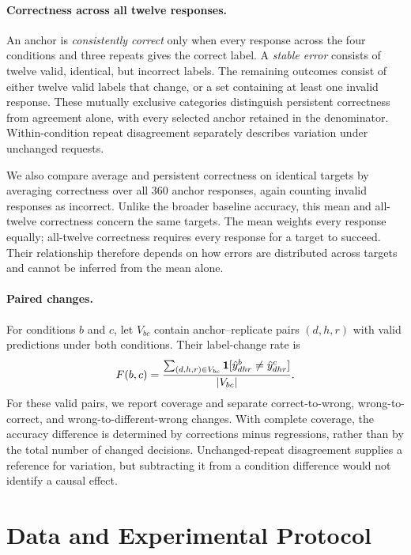 \documentclass{article}
\begin{document}
\paragraph{Correctness across all twelve responses.}
An anchor is \emph{consistently correct} only when every response across the four conditions and three repeats gives the correct label. A \emph{stable error} consists of twelve valid, identical, but incorrect labels. The remaining outcomes consist of either twelve valid labels that change, or a set containing at least one invalid response. These mutually exclusive categories distinguish persistent correctness from agreement alone, with every selected anchor retained in the denominator. Within-condition repeat disagreement separately describes variation under unchanged requests.

We also compare average and persistent correctness on identical targets by averaging correctness over all 360 anchor responses, again counting invalid responses as incorrect. Unlike the broader baseline accuracy, this mean and all-twelve correctness concern the same targets. The mean weights every response equally; all-twelve correctness requires every response for a target to succeed. Their relationship therefore depends on how errors are distributed across targets and cannot be inferred from the mean alone.

\paragraph{Paired changes.}
For conditions $b$ and $c$, let $V_{bc}$ contain anchor--replicate pairs $(d,h,r)$ with valid predictions under both conditions. Their label-change rate is
\begin{equation*}
F(b,c)=\frac{\sum_{(d,h,r)\in V_{bc}}\mathbf{1}[\hat y^b_{dhr}\ne\hat y^c_{dhr}]}{|V_{bc}|}.
\end{equation*}
For these valid pairs, we report coverage and separate correct-to-wrong, wrong-to-correct, and wrong-to-different-wrong changes. With complete coverage, the accuracy difference is determined by corrections minus regressions, rather than by the total number of changed decisions. Unchanged-repeat disagreement supplies a reference for variation, but subtracting it from a condition difference would not identify a causal effect.

\section{Data and Experimental Protocol}
\label{sec:protocol}
\end{document}
